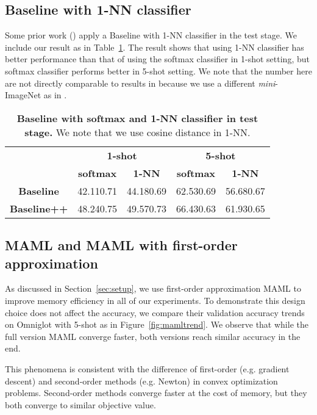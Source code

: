 \documentclass{article}
\newcommand{\secref}[1]{Section~\ref{sec:#1}}
\newcommand{\figref}[1]{Figure~\ref{fig:#1}}
\newcommand{\tabref}[1]{Table~\ref{tab:#1}}
\newcommand{\tb}[1]{\textbf{#1}}
\def \miniI {\emph{mini}-ImageNet }
\begin{document}
\subsection{Baseline with 1-NN classifier}
Some prior work (\cite{vinyals2016matching}) apply a Baseline with 1-NN classifier in the test stage. We include our result as in \tabref{nearest_neighbor}. The result shows that using 1-NN classifier has better performance than that of using the softmax classifier in 1-shot setting, but softmax classifier performs better in 5-shot setting. We note that the number here are not directly comparable to results in \cite{vinyals2016matching} because we use a different \miniI as in \cite{ravi2017optimization}.
\begin{table}[h]
\centering
\caption{\tb{Baseline with softmax and 1-NN classifier in test stage.} We note that we use cosine distance in 1-NN.}
\label{tab:nearest_neighbor}
\begin{tabular}{ccccc}
\toprule
           & \multicolumn{2}{c}{\tb{1-shot}}              & \multicolumn{2}{c}{\tb{5-shot}}  \\
           & \tb{softmax}        & \tb{1-NN} & \tb{softmax}        & \tb{1-NN}\\
\midrule
\small{\tb{Baseline}}   & 42.110.71 & 44.180.69 & 62.530.69 & 56.680.67\\
\small{\tb{Baseline++}} & 48.240.75 & 49.570.73 & 66.430.63 & 61.930.65\\ \bottomrule      
\end{tabular}
\vspace{-1cm}
\end{table} 
\newpage
\subsection{MAML and MAML with first-order approximation}
As discussed in \secref{setup}, we use first-order approximation MAML to improve memory efficiency in all of our experiments. To demonstrate this design choice does not affect the accuracy, we compare their validation accuracy trends on Omniglot with 5-shot as in \figref{mamltrend}. We observe that while the full version MAML converge faster, both versions reach similar accuracy in the end.

This phenomena is consistent with the difference of first-order (e.g. gradient descent) and second-order methods (e.g. Newton) in convex optimization problems.
Second-order methods converge faster at the cost of memory, but they both converge to similar objective value.
\end{document}
